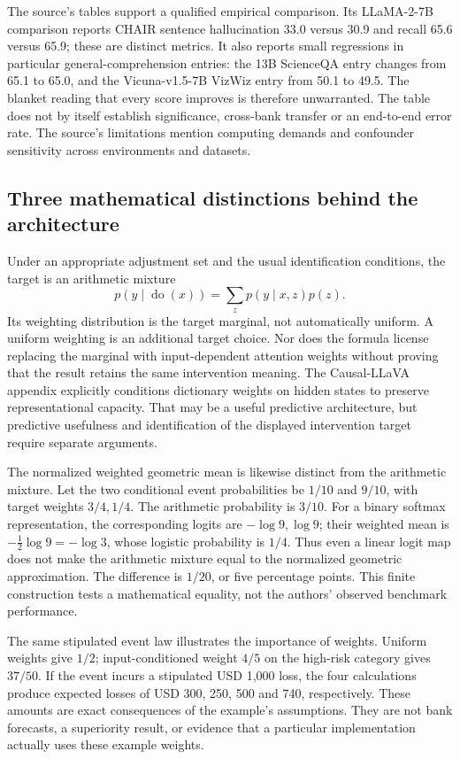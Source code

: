 The source's tables support a qualified empirical comparison. Its LLaMA-2-7B comparison reports CHAIR sentence hallucination
33.0 versus 30.9 and recall 65.6 versus 65.9; these are distinct metrics. It also reports small regressions in particular
general-comprehension entries: the 13B ScienceQA entry changes from 65.1 to 65.0, and the Vicuna-v1.5-7B VizWiz entry
from 50.1 to 49.5. The blanket reading that every score improves is therefore unwarranted. The table does not by itself
establish significance, cross-bank transfer or an end-to-end error rate. The source's limitations mention computing demands
and confounder sensitivity across environments and datasets.~\citep{exec28_fr_hu}

\subsection{Three mathematical distinctions behind the architecture}
Under an appropriate adjustment set and the usual identification conditions, the target is an arithmetic mixture
\[
 p(y\mid\operatorname{do}(x))=\sum_z p(y\mid x,z)p(z).
\]
Its weighting distribution is the target marginal, not automatically uniform. A uniform weighting is an additional target
choice. Nor does the formula license replacing the marginal with input-dependent attention weights without proving that the
result retains the same intervention meaning. The Causal-LLaVA appendix explicitly conditions dictionary weights on hidden
states to preserve representational capacity. That may be a useful predictive architecture, but predictive usefulness and
identification of the displayed intervention target require separate arguments.~\citep{exec28_fr_hu,pearl2009}

The normalized weighted geometric mean is likewise distinct from the arithmetic mixture. Let the two conditional event
probabilities be \(1/10\) and \(9/10\), with target weights \(3/4,1/4\). The arithmetic probability is \(3/10\).
For a binary softmax representation, the corresponding logits are \(-\log9,\log9\); their weighted mean is
\(-\tfrac12\log9=-\log3\), whose logistic probability is \(1/4\). Thus even a linear logit map does not make the arithmetic
mixture equal to the normalized geometric approximation. The difference is \(1/20\), or five percentage points.
This finite construction tests a mathematical equality, not the authors' observed benchmark performance.~\citep{exec28_fr_reference}

The same stipulated event law illustrates the importance of weights. Uniform weights give \(1/2\); input-conditioned
weight \(4/5\) on the high-risk category gives \(37/50\). If the event incurs a stipulated USD 1,000 loss, the four
calculations produce expected losses of USD 300, 250, 500 and 740, respectively. These amounts are exact consequences of
the example's assumptions. They are not bank forecasts, a superiority result, or evidence that a particular implementation
actually uses these example weights.~\citep{exec28_fr_reference}

